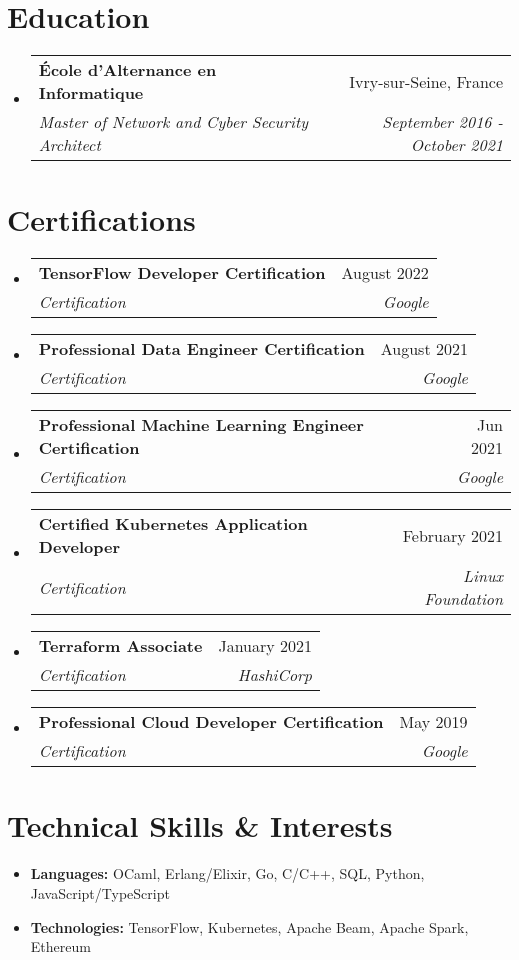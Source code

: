 \documentclass[letterpaper,11pt]{article}
\makeatletter
\newcommand{\resumeItem}[1]{
  \item\small{#1 \vspace{-2pt}}
}
\newcommand{\resumeSubheading}[4]{
  \vspace{-1pt}\item
    \begin{tabular*}{0.97\textwidth}[t]{l@{\extracolsep{\fill}}r}
      \textbf{#1} & #2 \\
      \textit{\small#3} & \textit{\small #4} \\
    \end{tabular*}\vspace{-5pt}
}
\newcommand{\resumeSubHeadingListStart}{\begin{itemize}[leftmargin=*]}
\newcommand{\resumeSubHeadingListEnd}{\end{itemize}}
\makeatother
\begin{document}
\section{Education}
\resumeSubHeadingListStart{}
\resumeSubheading{École d'Alternance en Informatique}
{Ivry-sur-Seine, France}
{Master of Network and Cyber Security Architect}
{September 2016 - October 2021}
\resumeSubHeadingListEnd{}


\section{Certifications}
\resumeSubHeadingListStart{}
\resumeSubheading{TensorFlow Developer Certification}
{August 2022}
{Certification}
{Google}
\resumeSubheading{Professional Data Engineer Certification}
{August 2021}
{Certification}
{Google}
\resumeSubheading{Professional Machine Learning Engineer Certification}
{Jun 2021}
{Certification}
{Google}
\resumeSubheading{Certified Kubernetes Application Developer}
{February 2021}
{Certification}
{Linux Foundation}
\resumeSubheading{Terraform Associate}
{January 2021}
{Certification}
{HashiCorp}
\resumeSubheading{Professional Cloud Developer Certification}
{May 2019}
{Certification}
{Google}
\resumeSubHeadingListEnd{}

\section{Technical Skills \& Interests}
\resumeSubHeadingListStart{}
\resumeItem{
  \textbf{Languages:}{
    OCaml, Erlang/Elixir, Go, C/C++, SQL, Python, JavaScript/TypeScript
  }
}
\resumeItem{
  \textbf{Technologies:}{
    TensorFlow, Kubernetes, Apache Beam, Apache Spark, Ethereum
  }
}
\resumeSubHeadingListEnd{}
\end{document}
